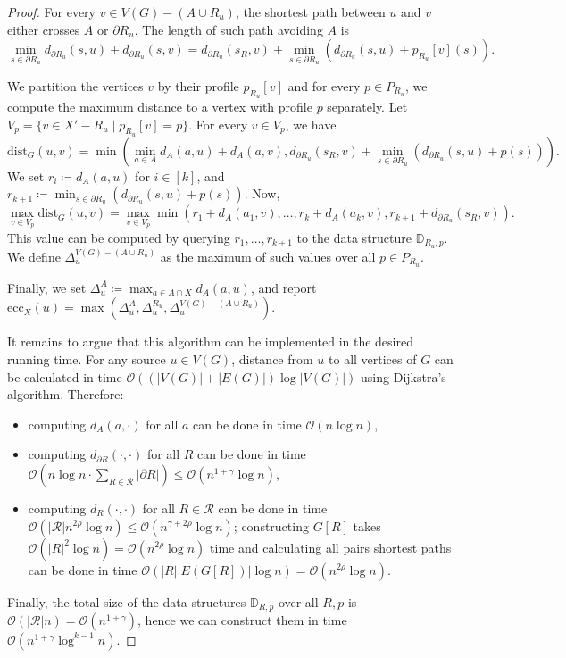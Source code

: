 \documentclass[11pt,a4paper]{article}
\newcommand{\Oh}{\mathcal{O}}
\newcommand{\dist}{\mathrm{dist}}
\newcommand{\ecc}{\mathrm{ecc}}
\renewcommand{\leq}{\leqslant}
\renewcommand{\setminus}{-}
\begin{document}
\begin{proof}
    For every $v \in V(G) \setminus (A \cup R_u)$, the shortest path between $u$ and $v$ either crosses $A$ or $\partial R_u$. The length of such path avoiding $A$ is
    $$ \min_{s \in \partial R_u} d_{\partial R_u}(s, u) + d_{\partial R_u}(s, v) = 
       d_{\partial R_u}(s_R, v) + \min_{s \in \partial R_u} \left( d_{\partial R_u}(s, u) + p_{R_u}[v](s) \right). $$

We partition the vertices $v$ by their profile $p_{R_u}[v]$ and for every $p \in P_{R_u}$, we compute the maximum distance to a vertex with profile $p$ separately. Let $V_p = \{ v \in X' \setminus R_u \mid p_{R_u}[v] = p \}$. For every $v \in V_p$, we have
    $$ \dist_G(u, v) = \min \left( \min_{a \in A} d_A(a, u) + d_A(a, v), d_{\partial R_u}(s_R, v) + \min_{s \in \partial R_u} \left( d_{\partial R_u}(s, u) + p(s) \right) \right). $$
    We set $r_i \coloneqq d_A(a, u)$ for $i \in [k]$, and $r_{k + 1} \coloneqq \min_{s \in \partial R_u}  \left( d_{\partial R_u}(s, u) + p(s) \right)$. Now,
    $$ \max_{v \in V_p} \dist_G(u, v) = \max_{v \in V_p} \min(r_1 + d_A(a_1, v), \dots, r_k + d_A(a_k, v), r_{k + 1} + d_{\partial R_u}(s_R, v)).$$
    This value can be computed by querying $r_1, \dots, r_{k + 1}$ to the data structure $\mathbb{D}_{R_u, p}$. We define $\Delta^{V(G) \setminus (A \cup R_u)}_u$ as the maximum of such values over all $p \in P_{R_u}$.
    
    Finally, we set $\Delta^{A}_u \coloneqq \max_{a \in A \cap X} d_A(a, u)$, and report $\ecc_X(u) = \max \left(\Delta^{A}_u, \Delta^{R_u}_u, \Delta^{V(G) \setminus (A \cup R_u)}_u \right)$.
    
    It remains to argue that this algorithm can be implemented in the desired running time. For any source $u \in V(G)$, distance from $u$ to all vertices of $G$ can be calculated in time $\Oh((|V(G)| + |E(G)|) \log |V(G)|)$ using Dijkstra's algorithm. Therefore:
    \begin{itemize}[nosep]
        \item computing $d_A(a,\cdot)$ for all $a$ can be done in time $\Oh (n \log n)$,
        \item computing $d_{\partial R}(\cdot,\cdot)$ for all $R$ can be done in time $\Oh (n\log n \cdot \sum_{R \in \mathcal{R}} |\partial R| ) \leq \Oh (n^{1 + \gamma} \log n)$,
        \item computing $d_R(\cdot,\cdot)$ for all $R \in \mathcal{R}$ can be done in time $\Oh (|\mathcal{R}| n^{2\rho} \log n) \leq \Oh (n^{\gamma + 2\rho} \log n)$; constructing $G[R]$ takes $\Oh(|R|^2 \log n) = \Oh(n^{2\rho} \log n)$ time and calculating all pairs shortest paths can be done in time $\Oh(|R||E(G[R])| \log n) = \Oh(n^{2\rho} \log n)$.
    \end{itemize}
    Finally, the total size of the data structures $\mathbb{D}_{R, p}$ over all $R, p$ is $\Oh(|\mathcal{R}| n) = \Oh (n^{1 + \gamma})$, hence we can construct them in time $\Oh (n^{1 + \gamma} \log^{k - 1} n)$.
    

\end{proof}
\end{document}
